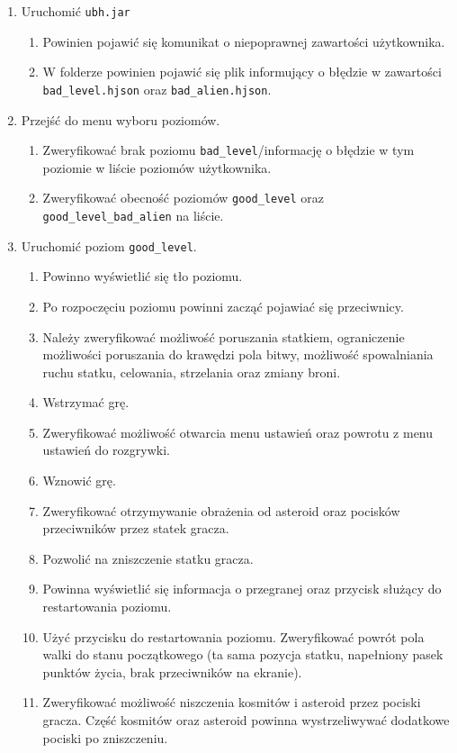 \documentclass{article}
\begin{document}
		\begin{enumerate}
			\item Uruchomić \verb|ubh.jar|
				\begin{enumerate}[label*=\arabic*]
					\item Powinien pojawić się komunikat o niepoprawnej zawartości użytkownika.
					\item W folderze powinien pojawić się plik informujący o błędzie w zawartości \verb|bad_level.hjson| oraz \verb|bad_alien.hjson|.
				\end{enumerate}
			\item Przejść do menu wyboru poziomów.
				\begin{enumerate}[label*=\arabic*]
					\item Zweryfikować brak poziomu \verb|bad_level|/informację o błędzie w tym poziomie w liście poziomów użytkownika.
					\item Zweryfikować obecność poziomów \verb|good_level| oraz \verb|good_level_bad_alien| na liście.
				\end{enumerate}
			\item Uruchomić poziom \verb|good_level|.
				\begin{enumerate}[label*=\arabic*]
					\item Powinno wyświetlić się tło poziomu.
					\item Po rozpoczęciu poziomu powinni zacząć pojawiać się przeciwnicy.
					\item Należy zweryfikować możliwość poruszania statkiem, ograniczenie możliwości poruszania do krawędzi pola bitwy, możliwość spowalniania ruchu statku, celowania, strzelania oraz zmiany broni.
					\item Wstrzymać grę.
					\item Zweryfikować możliwość otwarcia menu ustawień oraz powrotu z menu ustawień do rozgrywki.
					\item Wznowić grę.
					\item Zweryfikować otrzymywanie obrażenia od asteroid oraz pocisków przeciwników przez statek gracza.
					\item Pozwolić na zniszczenie statku gracza.
					\item Powinna wyświetlić się informacja o przegranej oraz przycisk służący do restartowania poziomu.
					\item Użyć przycisku do restartowania poziomu. Zweryfikować powrót pola walki do stanu początkowego (ta sama pozycja statku, napełniony pasek punktów życia, brak przeciwników na ekranie).
					\item Zweryfikować możliwość niszczenia kosmitów i asteroid przez pociski gracza. Część kosmitów oraz asteroid powinna wystrzeliwywać dodatkowe pociski po zniszczeniu.

\end{enumerate}
\end{enumerate}
\end{document}

